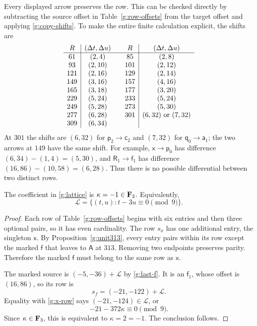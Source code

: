Every displayed arrow preserves the row.  This can
be checked directly by subtracting the source
offset in Table~\ref{g:row-offsets} from the target
offset and applying \eqref{g:copy-shifts}.  To make
the entire finite calculation explicit, the shifts
are
\begin{equation}\label{g:row-shift-table}
\begin{array}{c|c@{\qquad}c|c}
R&(\Delta t,\Delta u)&R&(\Delta t,\Delta u)\\\hline
61&(2,4)&85&(2,8)\\
93&(2,10)&101&(2,12)\\
121&(2,16)&129&(2,14)\\
149&(3,16)&157&(4,16)\\
165&(3,18)&177&(3,20)\\
229&(5,24)&233&(5,24)\\
249&(5,28)&273&(5,30)\\
277&(6,28)&301&(6,32)\text{ or }(7,32)\\
309&(6,34)&&
\end{array}
\end{equation}
At $301$ the shifts are $(6,32)$ for
$\mathsf p_2\to\mathsf c_2$ and $(7,32)$ for
$\mathsf q_0\to\mathsf a_1$; the two arrows at
$149$ have the same shift.  For example,
$\mathsf x\to\mathsf p_0$ has difference
$(6,34)-(1,4)=(5,30)$, and
$\mathsf R_1\to\mathsf f_1$ has difference
$(16,86)-(10,58)=(6,28)$.  Thus there is no
possible differential between two distinct rows.

\begin{proposition}\label{g:kappa}
The coefficient in \eqref{g:lattice} is
$\kappa=-1\in\mathbf F_3$.  Equivalently,
\[
 \mathcal L=\{(t,u):t-3u\equiv0\pmod9\}.
\]
\end{proposition}

\begin{proof}
Each row of Table~\ref{g:row-offsets} begins with
six entries and then three optional pairs, so it
has even cardinality.  The row $s_x$ has one
additional entry, the singleton $\mathsf x$.
By Proposition~\ref{g:unit313}, every entry pairs
within its row except the marked $\mathsf f$
that leaves to $\mathsf A$ at $313$.  Removing
two endpoints preserves parity.  Therefore the
marked $\mathsf f$ must belong to the same row
as $\mathsf x$.

The marked source is $(-5,-36)+\mathcal L$ by
\eqref{g:last-f}.  It is an $\mathsf f_1$,
whose offset is $(16,86)$, so its row is
\[
 s_f=(-21,-122)+\mathcal L.
\]
Equality with \eqref{g:x-row} says
$(-21,-124)\in\mathcal L$, or
\[
 -21-372\kappa\equiv0\pmod9.
\]
Since $\kappa\in\mathbf F_3$, this is equivalent to
$\kappa=2=-1$.  The conclusion follows.
\end{proof}

